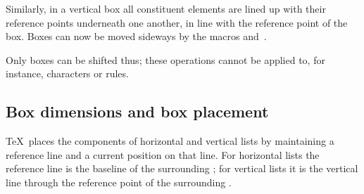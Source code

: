 \documentclass{book}
\begin{document}
Similarly, in a vertical box all constituent elements
are lined up with their reference points underneath one another,
in line with the reference point of the box.
Boxes can now be moved sideways by the macros
 and~.

Only boxes can be shifted thus; these operations cannot
be applied to, for instance, characters or rules.

\subsection{Box dimensions and box placement}

\TeX\ places the components of horizontal and
vertical lists by maintaining a reference line and a
current position on that line. For horizontal lists
the reference line is the baseline of the surrounding
; for vertical lists it is the vertical line
through the reference point of the surrounding .
\end{document}
